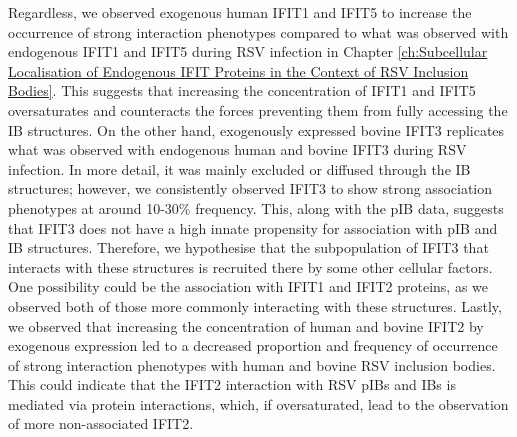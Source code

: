 Regardless, we observed exogenous human IFIT1 and IFIT5 to increase the occurrence of strong interaction phenotypes compared to what was observed with endogenous IFIT1 and IFIT5 during RSV infection in Chapter \ref{ch:Subcellular Localisation of Endogenous IFIT Proteins in the Context of RSV Inclusion Bodies}. This suggests that increasing the concentration of IFIT1 and IFIT5 oversaturates and counteracts the forces preventing them from fully accessing the IB structures. On the other hand, exogenously expressed bovine IFIT3 replicates what was observed with endogenous human and bovine IFIT3 during RSV infection. In more detail, it was mainly excluded or diffused through the IB structures; however, we consistently observed IFIT3 to show strong association phenotypes at around 10-30\% frequency. This, along with the pIB data, suggests that IFIT3 does not have a high innate propensity for association with pIB and IB structures. Therefore, we hypothesise that the subpopulation of IFIT3 that interacts with these structures is recruited there by some other cellular factors. One possibility could be the association with IFIT1 and IFIT2 proteins, as we observed both of those more commonly interacting with these structures. Lastly, we observed that increasing the concentration of human and bovine IFIT2 by exogenous expression led to a decreased proportion and frequency of occurrence of strong interaction phenotypes with human and bovine RSV inclusion bodies. This could indicate that the IFIT2 interaction with RSV pIBs and IBs is mediated via protein interactions, which, if oversaturated, lead to the observation of more non-associated IFIT2.

